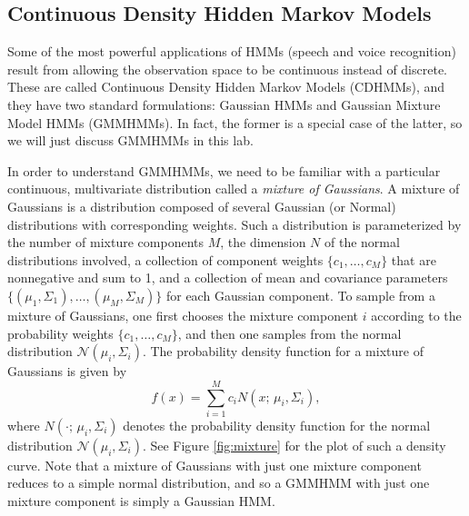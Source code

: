 
\subsection{Continuous Density Hidden Markov Models}
Some of the most powerful applications of HMMs (speech and voice recognition) result from allowing the observation space to be continuous instead of discrete.
These are called Continuous Density Hidden Markov Models (CDHMMs), and they have two standard formulations: Gaussian HMMs and Gaussian Mixture Model HMMs (GMMHMMs).
In fact, the former is a special case of the latter, so we will just discuss GMMHMMs in this lab.

In order to understand GMMHMMs, we need to be familiar with a particular continuous, multivariate distribution called a \emph{mixture of Gaussians}.
A mixture of Gaussians is a distribution composed of several Gaussian (or Normal) distributions with corresponding weights.
Such a distribution is parameterized by the number of mixture components $M$, the dimension $N$ of the normal distributions involved, a collection of component weights
$\{c_1, \ldots, c_M\}$ that are nonnegative and sum to 1, and a collection of mean and covariance parameters $\{(\mu_1,\Sigma_1), \ldots, (\mu_M,\Sigma_M)\}$ for each Gaussian
component. To sample from a mixture of Gaussians, one first chooses the mixture component $i$ according to the probability weights $\{c_1,\ldots,c_M\}$, and then one
samples from the normal distribution $\mathcal{N}(\mu_i, \Sigma_i)$. The probability density function for a mixture of Gaussians is given by
\[
f(x) = \sum_{i=1}^M c_iN(x;\,\mu_i,\Sigma_i),
\]
where $N(\cdot;\,\mu_i,\Sigma_i)$ denotes the probability density function for the normal distribution $\mathcal{N}(\mu_i, \Sigma_i)$.
See Figure \ref{fig:mixture} for the plot of such a density curve.
Note that a mixture of Gaussians with just one mixture component reduces to a simple normal distribution, and so a GMMHMM with just one mixture component
is simply a Gaussian HMM.

